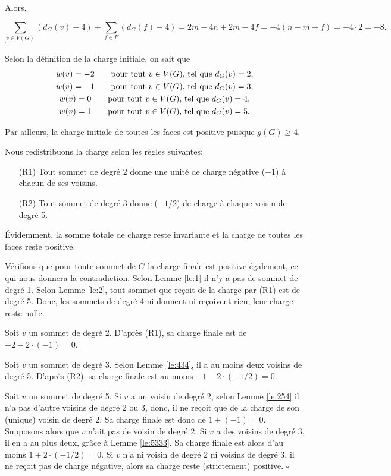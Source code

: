 \documentclass[10pt,a4paper]{article}
\newcommand{\ep}{{\hfill $\square$}}
\begin{document}
Alors,

$$ \sum_{v \in V(G)} (d_G(v) - 4) + \sum_{f\in F} (d_G(f) -4) = 2m -4n + 2m - 4f = -4(n - m + f) = -4\cdot 2 = -8.$$
\ep 

Selon la définition de la charge initiale, on sait que
$$ 
\gathered
w(v) = -2 \qquad \textrm{pour tout $v \in V(G)$, tel que } d_G(v) = 2, \\
w(v) = -1 \qquad \textrm{pour tout $v \in V(G)$, tel que } d_G(v) = 3, \\
w(v) =  0 \qquad \textrm{pour tout $v \in V(G)$, tel que } d_G(v) = 4, \\
w(v) =  1 \qquad \textrm{pour tout $v \in V(G)$, tel que } d_G(v) = 5.
\endgathered
$$

Par ailleurs, la charge initiale de toutes les faces est positive puisque $g(G)\ge 4$.

Nous redistribuons la charge selon les règles suivantes:
\begin{enumerate}
\item[(R1)] Tout sommet de degré 2 donne une unité de charge négative ($-1$) à chacun de ses voisins.
\item[(R2)] Tout sommet de degré 3 donne ($-1/2$) de charge à chaque voisin de degré 5.
\end{enumerate}

Évidemment, la somme totale de charge reste invariante et la charge de toutes les faces reste positive.

Vérifions que pour toute sommet de $G$ la charge finale est positive également, ce qui nous donnera la contradiction.
Selon Lemme \ref{le:1} il n'y a pas de sommet de degré 1.
Selon Lemme \ref{le:2}, tout sommet que reçoit de la charge par (R1) est de degré 5. Donc, les sommets de degré 4 ni donnent ni reçoivent rien, leur charge reste nulle.

Soit $v$ un sommet de degré 2. D'après (R1), sa charge finale est de $-2 - 2\cdot (-1)=0$.

Soit $v$ un sommet de degré 3. Selon Lemme \ref{le:434}, il a au moins deux voisins de degré 5. D'après (R2), sa charge finale est au moins $-1 - 2\cdot (-1/2) = 0$.

Soit $v$ un sommet de degré 5. Si $v$ a un voisin de degré 2, selon Lemme \ref{le:254} il n'a pas d'autre voisins de degré 2 ou 3, donc, il ne reçoit que de la charge de son (unique) voisin de degré 2. Sa charge finale est donc de $1+(-1)=0$.
Supposons alors que $v$ n'ait pas de voisin de degré 2. Si $v$ a des voisins de degré 3, il en a au plus deux, grâce à Lemme \ref{le:5333}. Sa charge finale est alors d'au moins $1+2\cdot(-1/2) = 0$. Si $v$ n'a ni voisin de degré 2 ni voisins de degré 3, il ne reçoit pas de charge négative, alors sa charge reste (strictement) positive.
\ep
\end{document}
